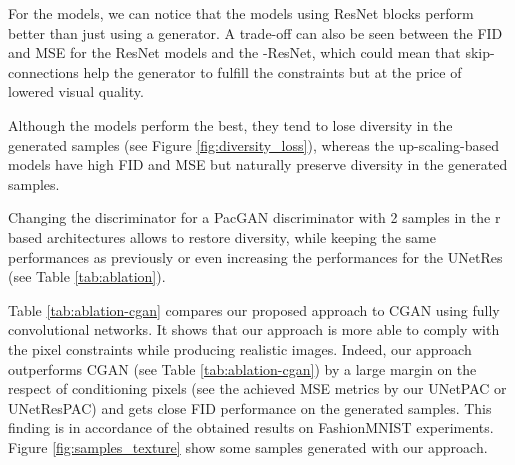 For the  models, we can notice that the models using ResNet blocks perform better than just using a  generator. A trade-off can also be seen between the FID and MSE for the ResNet models and the -ResNet, which could mean that skip-connections help the generator to fulfill the constraints but at the price of lowered visual quality.

Although the  models perform the best, they tend to lose diversity in the generated samples (see Figure \ref{fig:diversity_loss}), whereas the up-scaling-based models have high FID and MSE but naturally preserve diversity in the generated samples.

Changing the discriminator for a PacGAN discriminator with 2 samples in the r based architectures allows to restore diversity, while keeping the same performances as previously or even increasing the performances for the UNetRes (see Table \ref{tab:ablation}).

Table \ref{tab:ablation-cgan} compares our proposed approach to CGAN using fully convolutional networks. It shows that our approach is more able to comply with the pixel constraints while producing realistic images. Indeed, our approach outperforms CGAN (see Table \ref{tab:ablation-cgan}) by a large margin on the respect of conditioning pixels (see the achieved MSE metrics by  our UNetPAC or UNetResPAC)  and gets  close FID performance on the generated samples. This finding is in accordance of the obtained results on FashionMNIST experiments. Figure \ref{fig:samples_texture} show some samples generated with our approach.

